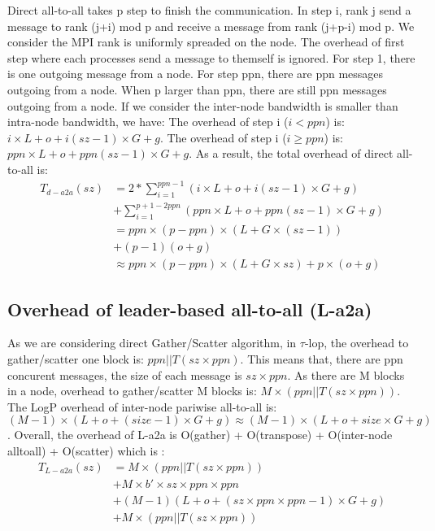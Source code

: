 Direct all-to-all takes p step to finish the communication.
In step i, rank j send a message to rank (j+i) mod p and receive a message from rank (j+p-i) mod p.
We consider the MPI rank is uniformly spreaded on the node.
The overhead of first step where each processes send a message to themself is ignored. 
For step 1, there is one outgoing message from a node.
For step ppn, there are ppn  messages outgoing from a node.
When p larger than ppn, there are still ppn messages outgoing from a node.
If we consider the inter-node bandwidth is smaller than intra-node bandwidth, we have:
The overhead of step i ($i < ppn$) is: $i\times L + o + i(sz-1)\times G + g$.
The overhead of step i ($i \ge ppn$) is: $ppn\times L + o + ppn(sz-1)\times G + g$.
As a result, the total overhead of direct all-to-all is:
\begin{equation}
\label{direct-all-to-all}
\begin{split}
T_{d-a2a}(sz)  & = 2*\sum_{i=1}^{ppn-1} (i\times L + o + i(sz-1)\times G + g) \\ 
				 & + \sum_{i=1}^{p + 1 - 2ppn}(ppn\times L + o + ppn(sz-1)\times G  + g)  \\
				 & = ppn \times (p - ppn) \times (L + G \times(sz - 1)) \\
				 & + (p - 1)(o + g)  \\
				 & \approx ppn \times (p - ppn) \times (L + G \times sz) + p\times(o+g)
\end{split}
\end{equation}

\subsection {Overhead of leader-based all-to-all (L-a2a)}

As we are considering direct Gather/Scatter algorithm, in $\tau$-lop, the overhead to gather/scatter one block is: $ppn||T(sz\times ppn)$.
This means that, there are ppn concurent messages, the size of each message is $sz\times ppn$.
As there are M blocks in a node, overhead to gather/scatter M blocks is: $M\times (ppn||T(sz\times ppn))$.
The LogP overhead of inter-node pariwise all-to-all is: $(M-1) \times (L + o +(size - 1) \times G + g) \approx (M-1) \times (L + o +size\times G + g)$.
Overall, the overhead of L-a2a is O(gather) + O(transpose) + O(inter-node alltoall) + O(scatter) which is :
\begin{equation}
\begin{split}
T_{L-a2a}(sz) & = M\times (ppn||T(sz\times ppn)) \\
			  & + M\times b'\times sz\times ppn\times ppn \\
			  & + (M-1) (L + o +(sz\times ppn\times ppn - 1) \times G + g) \\
			  & + M\times (ppn||T(sz\times ppn))  \\
\end{split}
\label{L-a2a-overhead}
\end{equation}

